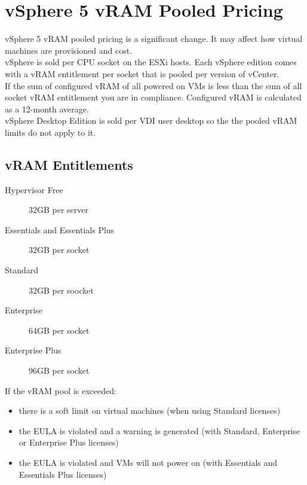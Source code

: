 \section{vSphere 5 vRAM Pooled Pricing}

vSphere 5 vRAM pooled pricing is a significant change. It may affect how
virtual machines are provisioned and cost.\\

vSphere is sold per CPU socket on the ESXi hosts. Each vSphere edition comes
with a vRAM entitlement per socket that is pooled per version of vCenter.\\

If the sum of configured vRAM of all powered on VMs is less than the sum of
all socket vRAM entitlement you are in compliance. Configured vRAM is
calculated as a 12-month average.\\

vSphere Desktop Edition is sold per VDI user desktop so the the pooled
vRAM limits do not apply to it.

\subsection{vRAM Entitlements}

\begin{description}
\item[Hypervisor Free] 32GB per server
\item[Essentials and Essentials Plus] 32GB per socket
\item[Standard] 32GB per soocket
\item[Enterprise] 64GB per socket
\item[Enterprise Plus] 96GB per socket
\end{description}

If the vRAM pool is exceeded:

\begin{itemize}

\item there is a soft limit on virtual machines (when using Standard licenses)

\item the EULA is violated and a warning is generated (with Standard,
Enterprise or Enterprise Plus licenses)

\item the EULA is violated and VMs will not power on (with Essentials and
Essentials Plus licenses)

\end{itemize}

